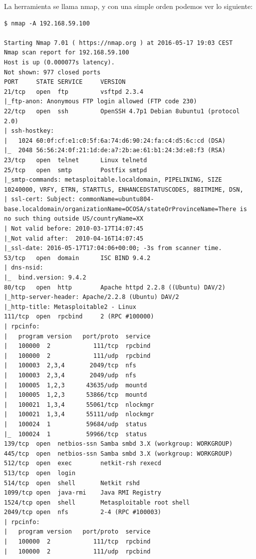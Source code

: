 \documentclass[a4paper,12pt]{scrartcl}
\begin{document}
\vspace{10pt}

La herramienta se llama nmap, y con una simple orden podemos ver lo siguiente:

\begin{lstlisting}[breaklines]
$ nmap -A 192.168.59.100

Starting Nmap 7.01 ( https://nmap.org ) at 2016-05-17 19:03 CEST
Nmap scan report for 192.168.59.100
Host is up (0.000077s latency).
Not shown: 977 closed ports
PORT     STATE SERVICE     VERSION
21/tcp   open  ftp         vsftpd 2.3.4
|_ftp-anon: Anonymous FTP login allowed (FTP code 230)
22/tcp   open  ssh         OpenSSH 4.7p1 Debian 8ubuntu1 (protocol 2.0)
| ssh-hostkey: 
|   1024 60:0f:cf:e1:c0:5f:6a:74:d6:90:24:fa:c4:d5:6c:cd (DSA)
|_  2048 56:56:24:0f:21:1d:de:a7:2b:ae:61:b1:24:3d:e8:f3 (RSA)
23/tcp   open  telnet      Linux telnetd
25/tcp   open  smtp        Postfix smtpd
|_smtp-commands: metasploitable.localdomain, PIPELINING, SIZE 10240000, VRFY, ETRN, STARTTLS, ENHANCEDSTATUSCODES, 8BITMIME, DSN, 
| ssl-cert: Subject: commonName=ubuntu804-base.localdomain/organizationName=OCOSA/stateOrProvinceName=There is no such thing outside US/countryName=XX
| Not valid before: 2010-03-17T14:07:45
|_Not valid after:  2010-04-16T14:07:45
|_ssl-date: 2016-05-17T17:04:06+00:00; -3s from scanner time.
53/tcp   open  domain      ISC BIND 9.4.2
| dns-nsid: 
|_  bind.version: 9.4.2
80/tcp   open  http        Apache httpd 2.2.8 ((Ubuntu) DAV/2)
|_http-server-header: Apache/2.2.8 (Ubuntu) DAV/2
|_http-title: Metasploitable2 - Linux
111/tcp  open  rpcbind     2 (RPC #100000)
| rpcinfo: 
|   program version   port/proto  service
|   100000  2            111/tcp  rpcbind
|   100000  2            111/udp  rpcbind
|   100003  2,3,4       2049/tcp  nfs
|   100003  2,3,4       2049/udp  nfs
|   100005  1,2,3      43635/udp  mountd
|   100005  1,2,3      53866/tcp  mountd
|   100021  1,3,4      55061/tcp  nlockmgr
|   100021  1,3,4      55111/udp  nlockmgr
|   100024  1          59684/udp  status
|_  100024  1          59966/tcp  status
139/tcp  open  netbios-ssn Samba smbd 3.X (workgroup: WORKGROUP)
445/tcp  open  netbios-ssn Samba smbd 3.X (workgroup: WORKGROUP)
512/tcp  open  exec        netkit-rsh rexecd
513/tcp  open  login
514/tcp  open  shell       Netkit rshd
1099/tcp open  java-rmi    Java RMI Registry
1524/tcp open  shell       Metasploitable root shell
2049/tcp open  nfs         2-4 (RPC #100003)
| rpcinfo: 
|   program version   port/proto  service
|   100000  2            111/tcp  rpcbind
|   100000  2            111/udp  rpcbind

\end{lstlisting}
\end{document}
